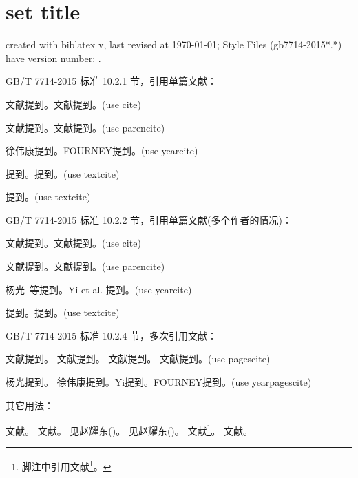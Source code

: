 \documentclass[twoside]{article}
\begin{document}
    \section{set title}
    created with biblatex v\versionofbiblatex, last revised at \today; Style Files (gb7714-2015*.*) have version number: \versionofgbtstyle.

\bigskip
    GB/T 7714-2015 标准 10.2.1 节，引用单篇文献：

    文献\cite{徐伟康2010对}提到。文献\cite{FOURNEY1971-17-38}提到。(use cite)\par
    文献\parencite{徐伟康2010对}提到。文献\parencite{FOURNEY1971-17-38}提到。(use parencite)\par
    徐伟康提到。FOURNEY提到。(use yearcite)\par
    \textcite{徐伟康2010对}提到。\textcite{FOURNEY1971-17-38}提到。(use textcite)\par
    \textcite{徐伟康2011}提到。(use textcite)

\bigskip
    GB/T 7714-2015 标准 10.2.2 节，引用单篇文献(多个作者的情况)：

    文献\cite{杨光2015经济波动}提到。文献\cite{Yi2013--}提到。(use cite)\par
    文献\parencite{杨光2015经济波动}提到。文献\parencite{Yi2013--}提到。(use parencite)\par
    杨光\ 等提到。Yi et al. 提到。(use yearcite)\par
    \textcite{杨光2015经济波动}提到。\textcite{Yi2013--}提到。(use textcite)\par


\bigskip
    GB/T 7714-2015 标准 10.2.4 节，多次引用文献：

    文献提到。
    文献提到。
    文献提到。
    文献提到。(use pagescite)\par
    杨光提到。
    徐伟康提到。Yi提到。FOURNEY提到。(use yearpagescite)\par

\bigskip
    其它用法：

    文献\cite[见][49页]{杨光2015经济波动}。
    文献\parencite[见][49页]{杨光2015经济波动}。
    见赵耀东(\cite*{杨光2015经济波动})。
    见赵耀东(\citeyear{杨光2015经济波动})。
    文献\footnote{脚注中引用文献\footcite{杨光2015经济波动}。}。
    文献。


    \printbibliography

    
\end{document}
